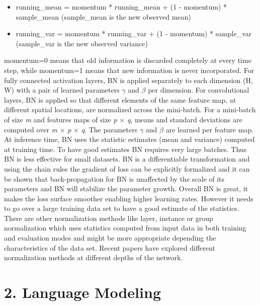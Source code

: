 \documentclass[11pt]{article}
\newcommand{\0}{\mat{0}}
\begin{document}
\begin{itemize}
	\begin{itemize}
    		\item running\_mean = momentum * running\_mean + (1 - momentum) * sample\_mean (sample\_mean is the new observed mean)
    		\item running\_var = momentum * running\_var + (1 - momentum) * sample\_var (sample\_var is the new observed variance)
    	\end{itemize}   
	momentum=0 means that old information is discarded completely at every time step, while momentum=1 means that new information is never incorporated. For fully connected activation layers, BN is applied separately to each dimension (H, W) with a pair of learned parameters $\gamma$ and $\beta$ per dimension. For convolutional layers, BN is applied so that different elements of the same feature map, at different spatial locations, are normalized across the mini-batch. For a mini-batch of size \textit{m} and features maps of size \textit{p} $\times$ \textit{q}, means and standard deviations are computed over \textit{m} $\times$ \textit{p} $\times$ \textit{q}. The parameters $\gamma$ and $\beta$ are learned per feature map. At inference time, BN uses the statistic estimates (mean and variance) computed at training time. To have good estimates BN requires very large batches. Thus BN is less effective for small datasets. BN is a differentiable transformation and using the chain rules the gradient of loss can be explicitly formalized and it can be shown that back-propagation for BN is unaffected by the scale of its parameters and BN will stabilize the parameter growth. Overall BN is great, it makes the loss surface smoother enabling higher learning rates. However it needs to go over a large training data set to have a good estimate of the statistics. There are other normalization methods like layer, instance or group normalization which uses statistics computed from input data in both training and evaluation modes and might be more appropriate depending the characteristics of the data set. Recent papers have explored different normalization methods at different depths of the network.
 \end{itemize}   
 
 \section*{2. Language Modeling}
 
\end{document}
